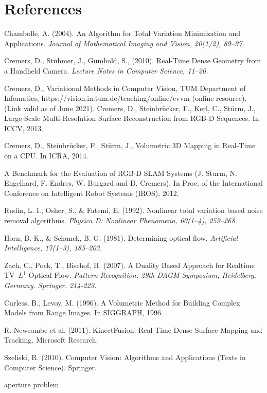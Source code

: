 \documentclass[conference]{IEEEtran}
\begin{document}
\section*{References}
\begin{thebibliography}{00}



    Chambolle, A. (2004). An Algorithm for Total Variation Minimization and Applications.
    \textit{Journal of Mathematical Imaging and Vision, 20(1/2), 89--97.}

Cremers, D., St\"uhmer, J., Gumhold, S., (2010). Real-Time Dense Geometry from a Handheld Camera.
    \textit{Lecture Notes in Computer Science, 11--20.}

    Cremers, D., Variational Methods in Computer Vision, TUM Department of Infomatics, https://vision.in.tum.de/teaching/online/cvvm (online resource). (Link valid as of June 2021).
    Cremers, D., Steinbr\"ucker, F., Kerl, C., St\"urm, J., Large-Scale Multi-Resolution Surface Reconstruction from RGB-D Sequences. In ICCV, 2013.

    Cremers, D., Steinbr\"ucker, F., St\"urm, J., Volumetric 3D Mapping in Real-Time on a CPU. In ICRA, 2014.

    A Benchmark for the Evaluation of RGB-D SLAM Systems (J. Sturm, N. Engelhard, F. Endres, W. Burgard and D. Cremers), In Proc. of the International Conference on Intelligent Robot Systems (IROS), 2012. 

    Rudin, L. I., Osher, S., \& Fatemi, E. (1992). Nonlinear total variation based noise removal algorithms.
    \textit{Physica D: Nonlinear Phenomena, 60(1--4), 259--268.}

    Horn, B. K., \& Schunck, B. G. (1981). Determining optical flow.
    \textit{Artificial Intelligence, 17(1--3), 185--203.}


Zach, C., Pock, T., Bischof, H. (2007). A Duality Based Approach for Realtime TV--$L^1$ Optical Flow. 
    \textit{Pattern Recognition: 29th DAGM Symposium, Heidelberg, Germany. Springer. 214-223.}

    Curless, B., Levoy, M. (1996). A Volumetric Method for Building Complex Models from Range Images. In SIGGRAPH, 1996.

    R. Newcombe et al. (2011). KinectFusion: Real-Time Dense Surface Mapping and Tracking. Microsoft Research.

    Szeliski, R. (2010). Computer Vision: Algorithms and Applications (Texts in Computer Science). Springer.

    aperture problem

\end{thebibliography}
\end{document}
